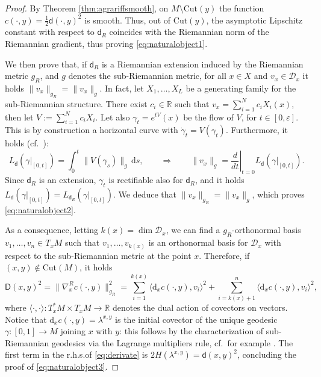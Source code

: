 \documentclass[11pt,a4paper]{article}
\theoremstyle{plain}
\theoremstyle{definition}
\theoremstyle{remark}
\numberwithin{equation}{section}
\newcommand{\R}{\mathbb{R}} %
\newcommand{\hor}{\mathscr{D}} %
\newcommand{\Cut}{\mathrm{Cut}}
\newcommand{\ve}{\varepsilon}
\newcommand{\di}{\mathrm{d}}
\newcommand{\sfd}{\mathsf d}
\newcommand{\sfD}{\mathsf D}
\begin{document}
\begin{proof}
By Theorem \ref{thm:agrariffsmooth}, on $M\setminus \Cut(y)$ the function $c(\cdot,y)=\tfrac{1}{2}\sfd(\cdot,y)^2$ is smooth. Thus, out of $\Cut(y)$, the asymptotic Lipschitz constant with respect to $\sfd_R$ coincides with the Riemannian norm of the Riemannian gradient, thus proving \eqref{eq:naturalobject1}.

We then prove that, if $\sfd_R$ is a Riemannian extension induced by the Riemannian metric $g_R$, and $g$ denotes the sub-Riemannian metric, for all $x\in X$ and $v_x\in \hor_x$ it holds $\|v_x\|_{g_R} = \|v_x\|_{g}$. In fact, let $X_1,\dots,X_L$ be a generating family for the sub-Riemannian structure. There exist $c_{i}\in \R$ such that $v_x = \sum_{i=1}^N c_i X_i(x)$, then let $V:=\sum_{i=1}^N c_i X_i$. Let also $\gamma_t = e^{tV}(x)$ be the flow of $V$, for $t\in [0,\ve]$. This is by construction a horizontal curve with $\dot{\gamma}_t = V(\gamma_t)$. Furthermore, it holds (cf.\ \cite[Ex.\ 3.51, 3.52]{nostrolibro}):
\begin{equation}
L_{\sfd}(\gamma|_{[0,t]}) = \int_0^t \|V(\gamma_s)\|_g\,\di s, \qquad \Longrightarrow \qquad \|v_x\|_{g} = \left.\frac{d}{dt}\right|_{t=0} L_{\sfd}(\gamma|_{[0,t]}).
\end{equation}
Since $\sfd_R$ is an extension, $\gamma_t$ is rectifiable also for $\sfd_R$, and it holds $L_{\sfd}(\gamma|_{[0,t]}) = L_{\sfd_R}(\gamma|_{[0,t]})$. We deduce that $\|v_x\|_{g_R} = \|v_x\|_{g}$, which proves \eqref{eq:naturalobject2}.

As a consequence, letting $k(x)=\dim\hor_x$, we can find a $g_R$-orthonormal basis $v_1,\dots,v_n \in T_x M$ such that $v_1,\dots,v_{k(x)}$ is an orthonormal basis for $\hor_x$ with respect to the sub-Riemannian metric at the point $x$. Therefore, if $(x,y)\notin \Cut(M)$, it holds
\begin{equation}\label{eq:derivate}
\sfD(x,y)^2 = \|\nabla^R_x c(\cdot,y)\|_{g_R}^2 = \sum_{i=1}^{k(x)} \langle \di_x c(\cdot,y),v_i\rangle^2 + \sum_{i=k(x)+1}^{n} \langle \di_x c(\cdot,y),v_i\rangle^2,
\end{equation}
where $\langle \cdot,\cdot\rangle : T_x^*M\times T_x M \to \R$ denotes the dual action of covectors on vectors. Notice that $\di_x c(\cdot,y)=\lambda^{x,y}$ is the initial covector of the unique geodesic $\gamma:[0,1]\to M$ joining $x$ with $y$: this follows by the characterization of sub-Riemannian geodesics via the Lagrange multipliers rule, cf.\ for example \cite[Prop.\@ 4.3, Lemma 2.20]{ABR-curvature}. The first term in the r.h.s.\@ of \eqref{eq:derivate} is $2H(\lambda^{x,y}) = \sfd(x,y)^2$, concluding the proof of \eqref{eq:naturalobject3}.
\end{proof}
\end{document}

